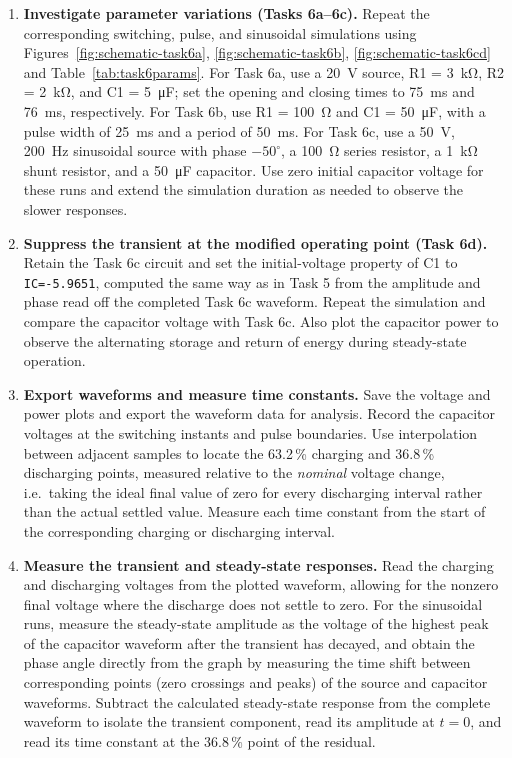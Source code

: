 \documentclass[12pt,a4paper]{article}
\begin{document}
\begin{enumerate}[label=\arabic*., leftmargin=2.5em, itemsep=6pt]
		\item \textbf{Investigate parameter variations (Tasks 6a--6c).}
		Repeat the corresponding switching, pulse, and sinusoidal
		simulations using
		Figures~\ref{fig:schematic-task6a}, \ref{fig:schematic-task6b},
		\ref{fig:schematic-task6cd}
		and Table~\ref{tab:task6params}.  For Task 6a, use a
		\SI{20}{\volt} source, R1 = \SI{3}{\kilo\ohm},
		R2 = \SI{2}{\kilo\ohm}, and C1 = \SI{5}{\micro\farad};
		set the opening and closing times to \SI{75}{\milli\second}
		and \SI{76}{\milli\second}, respectively.
		For Task 6b, use R1 = \SI{100}{\ohm} and
		C1 = \SI{50}{\micro\farad}, with a pulse width of
		\SI{25}{\milli\second} and a period of
		\SI{50}{\milli\second}.  For Task 6c, use a
		\SI{50}{\volt}, \SI{200}{\hertz} sinusoidal source with
		phase $-50^\circ$, a \SI{100}{\ohm} series resistor,
		a \SI{1}{\kilo\ohm} shunt resistor, and a
		\SI{50}{\micro\farad} capacitor.  Use zero initial
		capacitor voltage for these runs and extend the simulation
		duration as needed to observe the slower responses.
		
		\item \textbf{Suppress the transient at the modified operating
			point (Task 6d).}
		Retain the Task 6c circuit and set the initial-voltage property
		of C1 to \texttt{IC=-5.9651}, computed the same way as in
		Task 5 from the amplitude and phase read off the completed
		Task 6c waveform.  Repeat the simulation and compare the
		capacitor voltage with Task 6c.  Also plot the capacitor power
		to observe the alternating storage and return of energy during
		steady-state operation.
		
		\item \textbf{Export waveforms and measure time constants.}
		Save the voltage and power plots and export the waveform data
		for analysis.  Record the capacitor voltages at the switching
		instants and pulse boundaries.  Use interpolation between
		adjacent samples to locate the 63.2\,\% charging and
		36.8\,\% discharging points, measured relative to the
		\emph{nominal} voltage change, i.e.\ taking the ideal final
		value of zero for every discharging interval rather than the
		actual settled value.  Measure each time constant from the
		start of the corresponding charging or discharging interval.
		
		\item \textbf{Measure the transient and steady-state
			responses.}
		Read the charging and discharging voltages from the plotted
		waveform, allowing for the nonzero final voltage where the
		discharge does not settle to zero.  For the sinusoidal runs,
		measure the steady-state amplitude as the voltage of the highest
		peak of the capacitor waveform after the transient has decayed,
		and obtain the phase angle directly from the graph by measuring
		the time shift between corresponding points (zero crossings and
		peaks) of the source and capacitor waveforms.  Subtract the
		calculated steady-state response from the complete waveform to
		isolate the transient component, read its amplitude at $t = 0$,
		and read its time constant at the $36.8\,\%$ point of the
		residual.
		

\end{enumerate}
\end{document}
